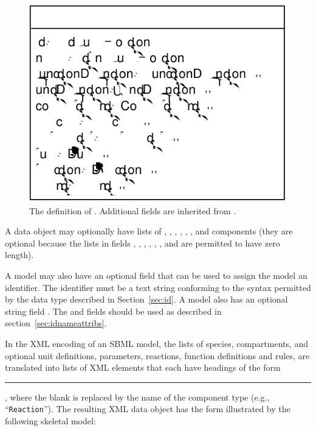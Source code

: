 \documentclass[10pt]{cekarticle}
\begin{document}
\begin{figure}[htb]
  \centering
  \includegraphics[scale = 0.68]{model}
  \caption{The definition of .  Additional fields are
    inherited from .}
  \label{fig:model}
\end{figure}

A  data object may optionally have lists of , , , , , , and  components (they are optional because the lists in fields , , , , , , and  are permitted to have zero length).

A model may also have an optional  field that can be
used to assign the model an identifier. The identifier must be a
text string conforming to the syntax permitted by the 
data type described in Section~\ref{sec:id}. A model also has an
optional string field .  The  and
 fields should be used as described in
section~\ref{sec:idnameattribs}.

In the XML encoding of an SBML model, the lists of species,
compartments, and optional unit definitions, parameters,
reactions, function definitions and rules, are translated into
lists of XML elements that each have headings of the form
\rule{0.5in}{0.5pt}, where the blank is
replaced by the name of the component type (e.g.,
``\texttt{Reaction}'').  The resulting XML data object has the
form illustrated by the following skeletal model:
\end{document}
